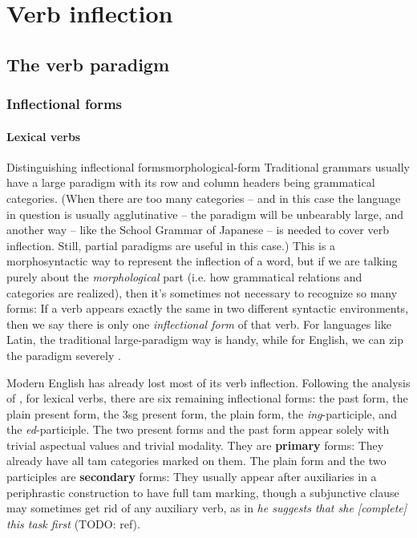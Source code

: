 \documentclass[UTF8, a4paper, oneside, scheme=plain]{ctexrep}
\newcommand*{\citesec}[1]{\S~{#1}}
\newcommand*{\citechap}[1]{Ch~{#1}}
\newcommand*{\citechapsec}[2]{\citechap{#1}.\citesec{#2}}
\newcommand*{\concept}[1]{\textbf{#1}}
\newcommand{\corpus}[1]{\emph{#1}}
\begin{document}
\chapter{Verb inflection}

\section{The verb paradigm}

\subsection{Inflectional forms}\label{sec:verb-forms}

\subsubsection{Lexical verbs}

\begin{theorybox}{Distinguishing inflectional forms}{morphological-form}
    Traditional grammars usually have a large paradigm
    with its row and column headers being grammatical categories.
    (When there are too many categories 
    -- and in this case the language in question is usually agglutinative -- 
    the paradigm will be unbearably large, 
    and another way -- like the School Grammar of Japanese -- is needed to cover verb inflection.
    Still, partial paradigms are useful in this case.) 
    This is a morphosyntactic way to represent the inflection of a word, 
    but if we are talking purely about the \emph{morphological} part
    (i.e. how grammatical relations and categories are realized),
    then it's sometimes not necessary to recognize so many forms:
    If a verb appears exactly the same in two different syntactic environments,
    then we say there is only one \emph{inflectional form} of that verb.
    For languages like Latin, 
    the traditional large-paradigm way is handy,
    while for English, we can zip the paradigm severely \citep[\citechapsec{3}{1.2}]{cgel}.
\end{theorybox}

Modern English has already lost most of its verb inflection.
Following the analysis of \citet[\citechapsec{3}{1.1}]{cgel},
for lexical verbs,
there are six remaining inflectional forms: 
the past form, the plain present form, 
the 3sg present form,
the plain form, the \corpus{ing}-participle,
and the \corpus{ed}-participle.
The two present forms and the past form appear solely 
with trivial aspectual values and trivial modality.
They are \concept{primary} forms:
They already have all \acs{tam} categories marked on them.
The plain form and the two participles are \concept{secondary} forms:
They usually appear after auxiliaries 
in a periphrastic construction to have full \acs{tam} marking,
though a subjunctive clause may sometimes get rid of any auxiliary verb,
as in \corpus{he suggests that she [complete] this task first} (TODO: ref).
\end{document}
